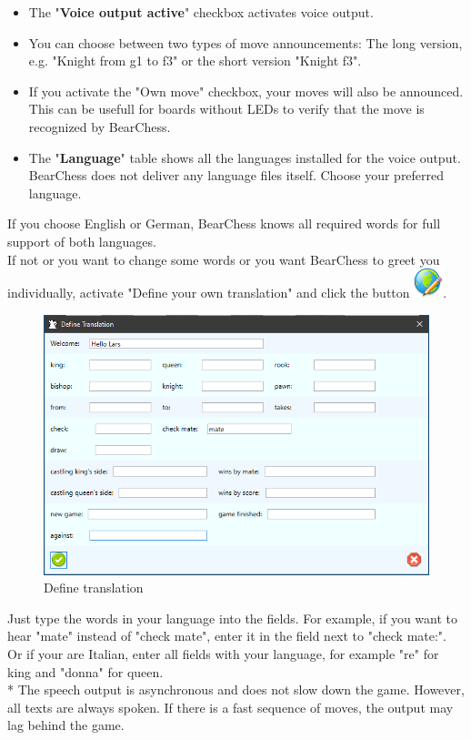 \documentclass[11pt,a4paper]{article}
\begin{document}
	\begin{itemize}
		\item The "\textbf{Voice output active}" checkbox activates voice output.
		\item You can choose between two types of move announcements: The long version, e.g. "Knight from g1 to f3" or the short version "Knight f3".
		\item If you activate the "Own move" checkbox, your moves will also be announced. This can be usefull for boards without LEDs to verify that the move is recognized by BearChess.
		\item The "\textbf{Language}" table shows all the languages installed for the voice output. BearChess does not deliver any language files itself. Choose your preferred language. 
	\end{itemize}
	If you choose English or German, BearChess knows all required words for full support of both languages.\\
	If not or you want to change some words or you want BearChess to greet you individually, activate "Define your own translation" and click the button \includegraphics[scale=0.5]{world_edit.png}.
	
	\begin{figure}[H]
		\centering
		\includegraphics[scale=0.7]{Sounds3.png}
		\caption{Define translation}
		\label{fig:Sounds3}
	\end{figure}
	Just type the words in your language into the fields. For example, if you want to hear "mate" instead of "check mate", enter it in the field next to "check mate:".\\
	Or if your are Italian, enter all fields with your language, for example "re" for king and "donna" for queen.\\
	{\color{red}*} The speech output is asynchronous and does not slow down the game. However, all texts are always spoken. If there is a fast sequence of moves, the output may lag behind the game.
	
\end{document}
